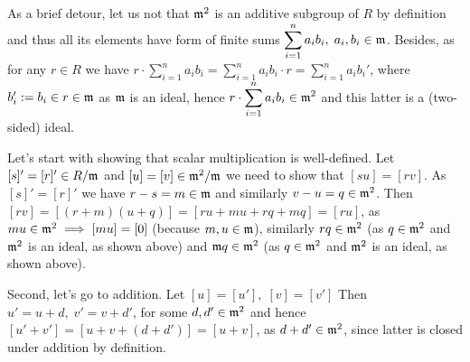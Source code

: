 \documentclass[8pt]{article} %
\begin{document}
\begin{enumerate}[label=\bfseries Problem \arabic*.]
{		As a brief detour, let us not that $\mathfrak{m}^2$ is an additive subgroup of $R$ by definition and thus all its elements
		have form of finite sums $\sum_{i=1}^n a_ib_i,\;a_i,b_i\in\m$. Besides, as for any $r\in R$ we have $r\cdot
		\sum_{i=1}^n a_ib_i=\sum_{i=1}^n a_ib_i\cdot r=\sum_{i=1}^n a_ib_i'$, where $b_i':=b_i\in r\in\mathfrak{m}$ as $\mathfrak{m}$ is
		an ideal, hence $r\cdot\sum_{i=1}^n a_ib_i\in\m^2$ and this latter is a (two-sided) ideal.

		Let's start with showing that scalar multiplication is well-defined.
		Let $[s]'=[r]'\in R/\mathfrak{m}$ and $[u]=[v]\in \mathfrak{m}^2/\mathfrak{m}$ we need to show that
		$[su]=[rv]$. As $[s]'=[r]'$ we have $r-s=m\in\mathfrak{m}$ and similarly $v-u=q\in\mathfrak{m}^2$. Then $[rv]=[(r+m)(u+q)]=
		[ru+mu+rq+mq]=[ru]$, as $mu\in\mathfrak{m}^2\implies[mu]=[0]$ (because $m,u\in\mathfrak{m}$), similarly $rq\in\mathfrak{m}^2$ (as $q\in \mathfrak{m}^2$ and
		$\mathfrak{m}^2$ is an ideal, as shown above) and $\mathfrak{m} q\in\mathfrak{m}^2$ (as $q\in \mathfrak{m}^2$ and $\mathfrak{m}^2$ is an ideal, as shown above).

		Second, let's go to addition. Let $[u]=[u'],\;[v]=[v']$ Then $u'=u+d,\;v'=v+d'$, for some $d,d'\in\mathfrak{m}^2$ and hence
		$[u'+v']=[u+v+(d+d')]=[u+v]$, as $d+d'\in\mathfrak{m}^2$, since latter is closed under addition by definition.

}
\end{enumerate}
\end{document}
